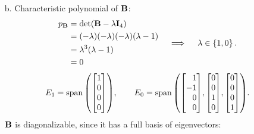 \documentclass[11pt]{article}
\begin{document}
\begin{enumerate}
\begin{enumerate}
              \item[b.] Characteristic polynomial of $\mathbf{B}$:
                    \[
                        \begin{aligned}
                            p_{\mathbf{B}}
                             & = \det(\mathbf{B} - \lambda \mathbf{I}_4)           \\
                             & = (-\lambda)(-\lambda)(-\lambda)(\lambda - 1) \\
                             & = \lambda^3 (\lambda - 1)                     \\
                             & = 0
                        \end{aligned}
                        \quad \implies \quad
                        \lambda \in \left\{1, 0\right\}.
                    \]
                    \[
                        E_1 = \Span \args{
                            \begin{bmatrix}
                                1 \\ 0 \\ 0 \\ 0
                            \end{bmatrix}
                        }
                        \! ,
                        \qquad
                        E_0 = \Span \args{
                            \begin{bmatrix*}[r]
                                1 \\ -1 \\ 0 \\ 0
                            \end{bmatrix*}
                            \! ,
                            \begin{bmatrix}
                                0 \\ 0 \\ 1 \\ 0
                            \end{bmatrix}
                            \! ,
                            \begin{bmatrix}
                                0 \\ 0 \\ 0 \\ 1
                            \end{bmatrix}
                        }
                        \! .
                    \]
                    $\mathbf{B}$ is diagonalizable, since it has a full basis of eigenvectors:

\end{enumerate}
\end{enumerate}
\end{document}
